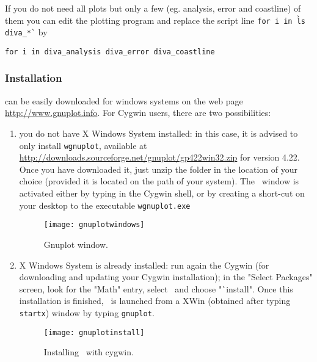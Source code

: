 \begin{tips}
If you do not need all plots but only a few (eg. analysis, error and coastline) of them you can edit the plotting program  and replace the script line \texttt{for i in \`ls diva\_*\`} by
\end{tips}
\texttt{for i in diva\_analysis diva\_error diva\_coastline}

\subsubsection{Installation}

\gnuplot can be easily downloaded for windows systems on the web page \url{http://www.gnuplot.info}. For Cygwin users, there are two possibilities:

\begin{enumerate}

\item you do not have X Windows System installed: in this case, it is advised to only install \texttt{wgnuplot}, available at\\
\url{http://downloads.sourceforge.net/gnuplot/gp422win32.zip} for version 4.22.\\
Once you have downloaded it, just unzip the folder in the location of your choice (provided it is located on the path of your system). The \gnuplot\, window is activated either by typing  in the Cygwin shell, or by creating a short-cut on your desktop to the executable \texttt{wgnuplot.exe}


\begin{figure}[htpb]
\centering
\parbox{.6\textwidth}{
\texttt{[image: gnuplotwindows]}
}\parbox{.4\textwidth}{
\caption{Gnuplot window.\label{fig:gnuplotwindows}}
}
\end{figure}

\item X Windows System is already installed: run again the Cygwin  (for downloading and updating your Cygwin installation); in the "Select Packages" screen, look for the "Math" entry, select \gnuplot\, and choose "`install". Once this installation is finished, \gnuplot\, is launched from a XWin (obtained after typing \texttt{startx}) window by typing \texttt{gnuplot}.

\begin{figure}[htpb]
\centering
\parbox{.7\textwidth}{
\texttt{[image: gnuplotinstall]}
}\parbox{.3\textwidth}{
\caption{Installing \gnuplot\, with cygwin.\label{fig:gnuplotinstall}}
}
\end{figure}

\end{enumerate} 


